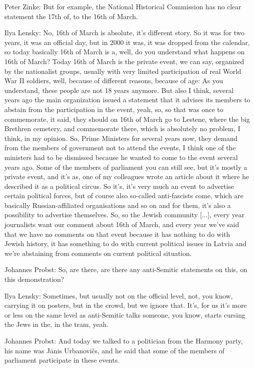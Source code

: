 Peter Zinke: But for example, the National Historical Commission has no clear statement the 17th of, to the 16th of March. 

Ilya Lensky: No, 16th of March is absolute, it’s different story. So it was for two years, it was an official day, but in 2000 it was, it was dropped from the calendar, so today basically 16th of March is a, well, do you understand what happens on 16th of March? Today 16th of March is the private event, we can say, organized by the nationalist groups, usually with very limited participation of real World War II soldiers, well, because of different reasons, because of age: As you understand, these people are not 18 years anymore. But also I think, several years ago the main organization issued a statement that it advises its members to abstain from the participation in the event, yeah, so, so that was once to commemorate, it said, they should on 16th of March go to Lestene, where the big Brethren cemetery, and commemorate there, which is absolutely no problem, I think, in my opinion. So, Prime Ministers for several years now, they demand from the members of government not to attend the events, I think one of the ministers had to be dismissed because he wanted to come to the event several years ago. Some of the members of parliament you can still see, but it’s mostly a private event, and it’s as, one of my colleagues wrote an article about it where he described it as a political circus. So it’s, it’s very much an event to advertise certain political forces, but of course also so-called anti-fascists come, which are basically Russian-affiliated organisations and so on and for them, it’s also a possibility to advertise themselves. So, so the Jewish community [...], every year journalists want our comment about 16th of March, and every year we’ve said that we have no comments on that event because it has nothing to do with Jewish history, it has something to do with current political issues in Latvia and we’re abstaining from comments on current political situation. 

Johannes Probst: So, are there, are there any anti-Semitic statements on this, on this demonstration? 

Ilya Lensky: Sometimes, but usually not on the official level, not, you know, carrying it on posters, but in the crowd, but we ignore that. 
It’s, for us it’s more or less on the same level as anti-Semitic talks someone, you know, starts cursing the Jews in the, in the tram, yeah. 

Johannes Probst: And today we talked to a politician from the Harmony party, his name was Jānis Urbanovičs, and he said that some of the members of parliament participate in these events. 

